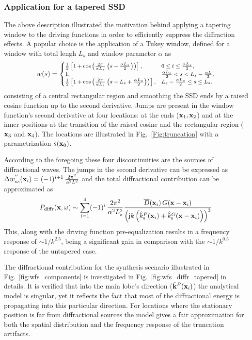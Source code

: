 \documentclass[lettersize,journal]{IEEEtran}
\begin{document}
\subsubsection{Application for a tapered SSD}
The above description illustrated the motivation behind applying a tapering window to the driving functions in order to efficiently suppress the diffraction effects.
A popular choice is the application of a Tukey window, defined for a window with total lengh $L_s$ and window parameter $\alpha$ as
\begin{equation}
  \footnotesize
w(s) =
\begin{cases} 
\frac{1}{2} \left[ 1 + \cos\left( \frac{2\pi}{\alpha L_s} \left( s - \frac{\alpha L_s}{2} \right) \right) \right], & 0 \leq t \leq \frac{\alpha L_s}{2}, \\
1, & \frac{\alpha L_s}{2} < s < L_s - \frac{\alpha L}{2}, \\
\frac{1}{2} \left[ 1 + \cos\left( \frac{2\pi}{\alpha L_s} \left( s - L_s + \frac{\alpha L_s}{2} \right) \right) \right], & L_s - \frac{\alpha L_s}{2} \leq s \leq L_s.
\end{cases}
\end{equation} 
consisting of a central rectangular region and smoothing the SSD ends by a raised cosine function up to the second derivative.
Jumps are present in the window function's second derivative at four locations: at the ends ($\mathbf{x}_1, \mathbf{x}_2$) and at the inner positions at the transition of the raised cosine and the rectangular region ($\mathbf{x}_3$ and $\mathbf{x}_4$).
The locations are illustrated in Fig.~\ref{Fig:truncation} with a parametrization $s(\mathbf{x}_0)$.

According to the foregoing these four discontinuities are the sources of diffractional waves.
The jumps in the second derivative can be expressed as $\Delta w^{''}_{ss}(\mathbf{x}_i) = (-1)^{i+1} \, \frac{2\pi^2}{\alpha^2 L^2}$ and the total diffractional contribution can be approximated as
\begin{equation}
  \small
  P_{\mathrm{diffr}}(\mathbf{x},\omega) \sim \sum_{i = 1}^{4} (-1)^{i} \, \frac{2\pi^2}{\alpha^2 L_s^2} \frac{\overline{D}(\mathbf{x}_i) \, G(\mathbf{x}-\mathbf{x}_i)}{\left(\mathrm{j} k \left(\hat{k}_\mathrm{s}^P(\mathbf{x}_i)+\hat{k}_\mathrm{s}^G(\mathbf{x}-\mathbf{x}_i)\right)\right)^3}   
\end{equation}
This, along with the driving function pre-equalization results in a frequency response of $\sim 1 / k^{2.5}$, being a significant gain in comparison with the  $\sim 1 / k^{0.5}$ response of the untapered case.

The diffractional contribution for the synthesis scenario illustrated in Fig.~\ref{fig:wfs_components} is investigated in Fig.~\ref{fig:wfs_diffr_tapered} in details.
It is verified that into the main lobe's direction ($\hat{\mathbf{k}}^P(\mathbf{x}_i)$) the analytical model is singular, yet it reflects the fact that most of the diffractional energy is propagating into this particular direction.
For locations where the stationary position is far from diffractional sources the model gives a fair approximation for both the spatial distribution and the frequency response of the truncation artifacts. 
\end{document}
